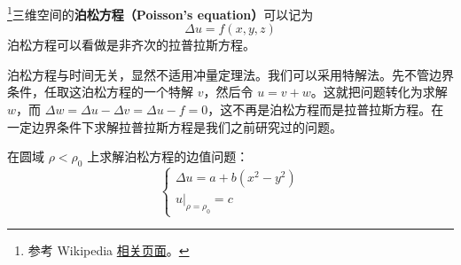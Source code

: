 

\footnote{参考 Wikipedia \href{https://en.wikipedia.org/wiki/Poisson's_equation}{相关页面}。}三维空间的\textbf{泊松方程（Poisson's equation）}可以记为
\begin{equation}
\Delta u=f(x, y, z)
\end{equation}
泊松方程可以看做是非齐次的拉普拉斯方程。

泊松方程与时间无关，显然不适用冲量定理法。我们可以采用特解法。先不管边界条件，任取这泊松方程的一个特解 $v$，然后令 $u=v+w$。这就把问题转化为求解 $w$，而 $\Delta w=\Delta u-\Delta v=\Delta u-f=0$，这不再是泊松方程而是拉普拉斯方程。在一定边界条件下求解拉普拉斯方程是我们之前研究过的问题。

\begin{example}{}
在圆域 $\rho<\rho_0$ 上求解泊松方程的边值问题：
\begin{equation}
\left\{\begin{array}{l}\Delta u=a+b\left(x^{2}-y^{2}\right) \\ \left.u\right|_{\rho=\rho_{0}}=c\end{array}\right.
\end{equation}


\end{example}
